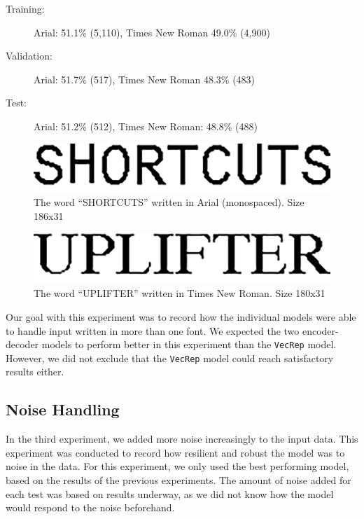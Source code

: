 \vspace{0.5cm}
\begin{minipage}{0.8\linewidth}
    \begin{description}
        \item[Training:]{Arial: 51.1\% (5,110), Times New Roman 49.0\% (4,900)}
        \item[Validation:]{Arial: 51.7\% (517), Times New Roman 48.3\% (483)}
        \item[Test:]{Arial: 51.2\% (512), Times New Roman: 48.8\% (488)}
    \end{description}
\end{minipage}

\begin{figure}[ht]
    \centering
    \captionsetup{justification=centering}
    \includegraphics[width=1\textwidth]{fig/experiments/SHORTCUTS_dpi.png}
    \caption{The word ``SHORTCUTS'' written in Arial (monospaced). Size 186x31}
    \label{fig:word_arial}
\end{figure}

\begin{figure}[ht]
    \centering
    \captionsetup{justification=centering}
    \includegraphics[width=1\textwidth]{fig/experiments/UPLIFTER_dpi.png}
    \caption{The word ``UPLIFTER'' written in Times New Roman. Size 180x31}
    \label{fig:word_times_new_roman}
\end{figure}

Our goal with this experiment was to record how the individual models were able to handle input written in more than one font. We expected the two encoder-decoder models to perform better in this experiment than the {\tt VecRep} model. However, we did not exclude that the {\tt VecRep} model could reach satisfactory results either.

\subsection{Noise Handling}
In the third experiment, we added more noise increasingly to the input data. This experiment was conducted to record how resilient and robust the model was to noise in the data. For this experiment, we only used the best performing model, based on the results of the previous experiments. The amount of noise added for each test was based on results underway, as we did not know how the model would respond to the noise beforehand.


